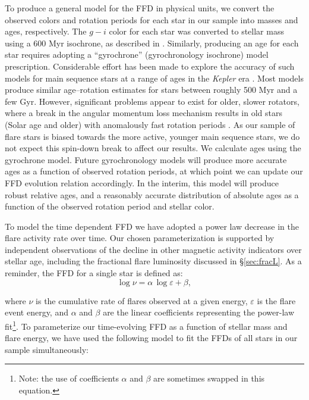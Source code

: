 \documentclass[preprint2]{aastex62}
\newcommand{\Kepler}{\textsl{Kepler}\xspace}
\begin{document}
To produce a general model for the FFD in physical units, we convert the observed colors and rotation periods for each star in our sample into masses and ages, respectively. The $g-i$ color for each star was converted to stellar mass using a 600 Myr isochrone, as described in \citet{davenport2016}. Similarly, producing an age for each star requires adopting a ``gyrochrone'' (gyrochronology isochrone) model prescription. Considerable effort has been made to explore the accuracy of such models for main sequence stars at a range of ages in the \Kepler era \citep[e.g.][]{mms+11,angus2015,douglas2016}. Most models produce similar age--rotation estimates for stars between roughly 500 Myr and a few Gyr. However, significant problems appear to exist for older, slower rotators, where a break in the angular momentum loss mechanism results in old stars (Solar age and older) with anomalously fast rotation periods \citep{van-saders2016}. As our sample of flare stars is biased towards the more active, younger main sequence stars, we do not expect this spin-down break to affect our results. We calculate ages using the \citet{mamajek2008} gyrochrone model. Future gyrochronology models will produce more accurate ages as a function of observed rotation periods, at which point we can update our FFD evolution relation accordingly. In the interim, this model will produce robust relative ages, and a reasonably accurate distribution of absolute ages as a function of the observed rotation period and stellar color.



To model the time dependent FFD we have adopted a power law decrease in the flare activity rate over time. Our chosen parameterization is supported by independent observations of the decline in other magnetic activity indicators over stellar age, including the fractional flare luminosity discussed in \S\ref{sec:fracL}. As a reminder, the FFD for a single star is defined  \citep[e.g. Eqn. 18 from][]{lme1976} as:
\begin{equation}
\log \nu = \alpha \, \log \varepsilon + \beta,
\end{equation}

\noindent
where $\nu$ is the cumulative rate of flares observed at a given energy, $\varepsilon$ is the flare event energy, and $\alpha$ and $\beta$ are the linear coefficients representing the power-law fit\footnote{Note: the use of coefficients $\alpha$ and $\beta$ are sometimes swapped in this equation.}.
To parameterize our time-evolving FFD as a function of stellar mass and flare energy, we have used the following model to fit the FFDs of all stars in our sample simultaneously:
\end{document}

